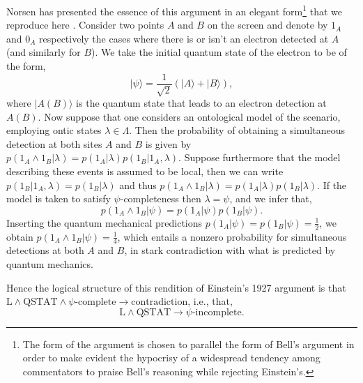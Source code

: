 \documentclass[aps,nofootinbib,12pt]{revtex4}
\begin{document}
Norsen has presented the essence of this argument in an elegant
form\footnote{The form of the argument is chosen to parallel the
form of Bell's argument in order to make evident the hypocrisy of a
widespread tendency among commentators to praise Bell's reasoning
while rejecting Einstein's.} that we reproduce here
\cite{norsenboxes}. Consider two points $A$ and $B$ on the screen
and denote by $1_{A}$ and $0_{A}$ respectively the cases where there
is or isn't an electron detected at $A$ (and similarly for $B$). We
take the initial quantum state of the electron to be of the form,
\begin{equation}
|\psi\rangle=\frac{1}{\sqrt{2}}(|A\rangle + |B\rangle),
\end{equation}
where $|A(B)\rangle$ is the quantum state that leads to an electron
detection at $A(B)$. Now suppose that one considers an ontological
model of the scenario, employing ontic states $\lambda\in\Lambda$.
Then the probability of obtaining a simultaneous detection at both
sites $A$ and $B$ is given by $p(1_{A}\wedge
{1}_{B}|\lambda)=p(1_{A}|\lambda)p(1_{B}|1_{A},\lambda)$. Suppose
furthermore that the model describing these events is assumed to be
local, then we can write $p(1_{B}|1_{A},\lambda)=p(1_{B}|\lambda)$
and thus $p(1_{A}\wedge
{1}_{B}|\lambda)=p(1_{A}|\lambda)p(1_{B}|\lambda)$. If the model is
taken to satisfy $\psi$-completeness then $\lambda=\psi$, and we
infer that,
\begin{equation}
p(1_{A}\wedge{1}_{B}|\psi)=p(1_{A}|\psi)p(1_{B}|\psi).
\label{probs_local}
\end{equation}
Inserting the quantum mechanical predictions $p(1_{A}|\psi)=p(1_{B}
|\psi)=\frac{1}{2}$, we obtain
$p(1_{A}\wedge{1}_{B}|\psi)=\frac{1}{4}$, which entails a nonzero
probability for simultaneous detections at both $A$ and $B$, in
stark contradiction with what is predicted by quantum mechanics.

Hence the logical structure of this rendition of Einstein's 1927
argument is that
$\text{L}\wedge\text{QSTAT}\wedge\psi\text{-complete}
\rightarrow\text{contradiction}$, i.e., that,
\begin{equation}
\text{L}\wedge\text{QSTAT}\rightarrow\psi\text{-incomplete}.
\label{E1927_logical}
\end{equation}
\end{document}
